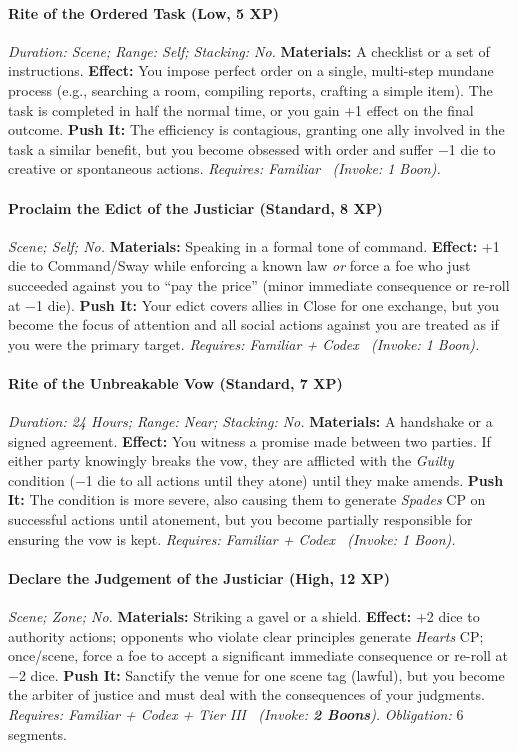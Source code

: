 \paragraph{Rite of the Ordered Task (Low, 5 XP)} \emph{Duration: Scene; Range: Self; Stacking: No.}
\textbf{Materials:} A checklist or a set of instructions.
\textbf{Effect:} You impose perfect order on a single, multi-step mundane process (e.g., searching a room, compiling reports, crafting a simple item). The task is completed in half the normal time, or you gain +1 effect on the final outcome.
\textbf{Push It:} The efficiency is contagious, granting one ally involved in the task a similar benefit, but you become obsessed with order and suffer −1 die to creative or spontaneous actions.
\emph{Requires: Familiar \ (\textit{Invoke:} 1 Boon).}
\paragraph{Proclaim the Edict of the Justiciar (Standard, 8 XP)} \emph{Scene; Self; No.}
\textbf{Materials:} Speaking in a formal tone of command.
\textbf{Effect:} +1 die to Command/Sway while enforcing a known law \emph{or} force a foe who just succeeded against you to ``pay the price'' (minor immediate consequence or re-roll at −1 die).
\textbf{Push It:} Your edict covers allies in Close for one exchange, but you become the focus of attention and all social actions against you are treated as if you were the primary target.
\emph{Requires: Familiar + Codex \ (\textit{Invoke:} 1 Boon).}
\paragraph{Rite of the Unbreakable Vow (Standard, 7 XP)} \emph{Duration: 24 Hours; Range: Near; Stacking: No.}
\textbf{Materials:} A handshake or a signed agreement.
\textbf{Effect:} You witness a promise made between two parties. If either party knowingly breaks the vow, they are afflicted with the \emph{Guilty} condition (−1 die to all actions until they atone) until they make amends.
\textbf{Push It:} The condition is more severe, also causing them to generate \emph{Spades} CP on successful actions until atonement, but you become partially responsible for ensuring the vow is kept.
\emph{Requires: Familiar + Codex \ (\textit{Invoke:} 1 Boon).}
\paragraph{Declare the Judgement of the Justiciar (High, 12 XP)} \emph{Scene; Zone; No.}
\textbf{Materials:} Striking a gavel or a shield.
\textbf{Effect:} +2 dice to authority actions; opponents who violate clear principles generate \emph{Hearts} CP; once/scene, force a foe to accept a significant immediate consequence or re-roll at −2 dice.
\textbf{Push It:} Sanctify the venue for one scene tag (lawful), but you become the arbiter of justice and must deal with the consequences of your judgments.
\emph{Requires: Familiar + Codex + Tier III \ (\textit{Invoke:} \textbf{2 Boons}).}
\emph{Obligation:} 6 segments.

